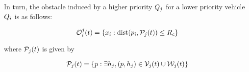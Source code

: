 In turn, the obstacle induced by a higher priority $Q_j$ for a lower priority vehicle $Q_i$ is as follows:

\begin{equation}
\mathcal{O}_i^j(t) = \{x_i: \text{dist}(p_i, \mathcal{P}_j(t)) \le R_c \}
\end{equation}

\noindent where $\mathcal{P}_j(t)$ is given by

\begin{equation}
\mathcal{P}_j(t) = \{p: \exists h_j, (p, h_j) \in \mathcal{V}_j(t) \cup \mathcal{W}_j(t)\}
\end{equation}